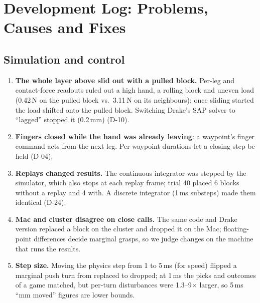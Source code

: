 \documentclass[conference]{IEEEtran}
\begin{document}
\appendices
\section{Development Log: Problems, Causes and Fixes}\label{app:log}
\subsection*{Simulation and control}
\begin{enumerate}
\item \textbf{The whole layer above slid out with a pulled block.} Per-leg and contact-force readouts ruled out a high
hand, a rolling block and uneven load (0.42\,N on the pulled block vs.\ 3.11\,N on its neighbours); once sliding started
the load shifted onto the pulled block. Switching Drake's SAP solver to ``lagged'' stopped it (0.2\,mm) (D-10).
\item \textbf{Fingers closed while the hand was already leaving}: a waypoint's finger command acts from the next leg.
Per-waypoint durations let a closing step be held (D-04).
\item \textbf{Replays changed results.} The continuous integrator was stepped by the simulator, which also stops at each
replay frame; trial 40 placed 6 blocks without a replay and 4 with. A discrete integrator (1\,ms substeps) made them
identical (D-24).
\item \textbf{Mac and cluster disagree on close calls.} The same code and Drake version replaced a block on the cluster
and dropped it on the Mac; floating-point differences decide marginal grasps, so we judge changes on the machine that
runs the results.
\item \textbf{Step size.} Moving the physics step from 1 to 5\,ms (for speed) flipped a marginal push turn from replaced
to dropped; at 1\,ms the picks and outcomes of a game matched, but per-turn disturbances were 1.3--9$\times$ larger, so
5\,ms ``mm moved'' figures are lower bounds.
\end{enumerate}
\end{document}
